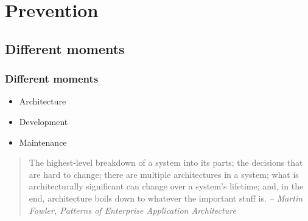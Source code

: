 \section{Prevention}

\subsection{Different moments}

\begin{frame}
\frametitle{Different moments}
\begin{itemize}
\item Architecture
\item Development
\item Maintenance
\end{itemize}
\end{frame}

\begin{frame}
\begin{quote}
The highest-level breakdown of a system into its parts; the decisions that are
hard to change; there are multiple architectures in a system; what is
architecturally significant can change over a system's lifetime; and, in the
end, architecture boils down to whatever the important stuff is.
\textit{-- Martin Fowler, Patterns of Enterprise Application Architecture}
\end{quote}
\end{frame}

